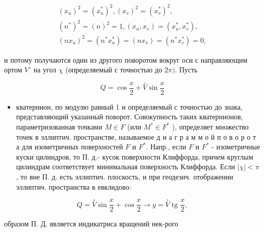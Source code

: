 \documentclass[10pt]{article}
\begin{document}
\[

\begin{gathered}

\left(x_{u}\right)^{2}=\left(x_{u}^{*}\right)^{2},\left(x_{v}\right)^{2}=\left(x_{v}^{*}\right)^{2}, \\

\left(n^{*}\right)^{2}=(n)^{2}=1,\left(x_{u}, x_{v}\right)=\left(x_{u}^{*}, x_{v}^{*}\right), \\

\left(n x_{u}\right)^{2}=\left(n^{*} x_{u}^{*}\right)=\left(n x_{v}\right)=\left(n^{*} x_{v}^{*}\right)=0,

\end{gathered}

\]



и потому получаются один из другого поворотом вокруг оси с направляющим ортом $V^{\circ}$ на угол $\chi$ (определяемый с точностью до $2 \pi)$. Пусть



\[

Q=\cos \frac{x}{2}+\stackrel{\circ}{V} \sin \frac{x}{2}

\]



\begin{itemize}

  \item кватернион, по модулю равный 1 и определяемый с точностью до знака, представляющий указанный поворот. Совокупность таких кватернионов, параметризованная точками $M \in F$ (или $M^{*} \in F^{*}$ ), определяет множество точек в эллиптич. пространстве, называемое д и а г р а м м о й п о в о р о т а для изометричных поверхностей $F$ и $F^{*}$. Напр., если $F$ и $F^{*}$ - изометричные куски цилиндров, то П. д.- кусок поверхности Клиффорда, причем круглым цилиндрам соответствует минимальная поверхность Клиффорда. Если $|\chi|<\pi$, то вне П. д. есть эллиптич. плоскость, и при геодезич. отображении эллиптич. пространства в евклидово:

\end{itemize}



\[

Q=\stackrel{\circ}{V} \sin \frac{x}{2}+\cos \frac{x}{2} \rightarrow y=\stackrel{\circ}{V} \operatorname{tg} \frac{x}{2},

\]



образом П. Д. является индикатриса вращений нек-рого
\end{document}
